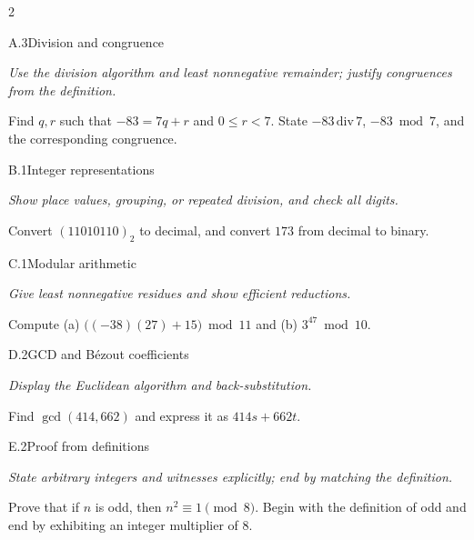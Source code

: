 \documentclass[9pt]{extarticle}
\begin{document}
\begin{multicols}{2}
\begin{CoreProblem}{A.3}{Division and congruence}
{\scriptsize\textit{Use the division algorithm and least nonnegative remainder; justify congruences from the definition.}\par}
Find $q,r$ such that $-83=7q+r$ and $0\le r<7$. State
$-83\,\mathrm{div}\,7$, $-83\bmod7$, and the corresponding congruence.
\end{CoreProblem}
\begin{CoreProblem}{B.1}{Integer representations}
{\scriptsize\textit{Show place values, grouping, or repeated division, and check all digits.}\par}
Convert $(11010110)_2$ to decimal, and convert $173$ from decimal to binary.
\end{CoreProblem}
\begin{CoreProblem}{C.1}{Modular arithmetic}
{\scriptsize\textit{Give least nonnegative residues and show efficient reductions.}\par}
Compute (a) $\bigl((-38)(27)+15\bigr)\bmod11$ and
(b) $3^{47}\bmod10$.
\end{CoreProblem}
\columnbreak
\begin{CoreProblem}{D.2}{GCD and B\'ezout coefficients}
{\scriptsize\textit{Display the Euclidean algorithm and back-substitution.}\par}
Find $\gcd(414,662)$ and express it as $414s+662t$.
\end{CoreProblem}
\begin{CoreProblem}{E.2}{Proof from definitions}
{\scriptsize\textit{State arbitrary integers and witnesses explicitly; end by matching the definition.}\par}
Prove that if $n$ is odd, then $n^2\equiv1\pmod{8}$. Begin with the definition
of odd and end by exhibiting an integer multiplier of $8$.
\end{CoreProblem}
\end{multicols}
\CoreWorkArea
\FormBreak
{}
\end{document}
